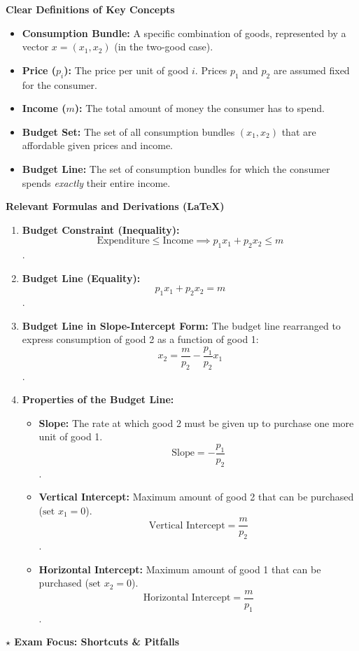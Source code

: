 \documentclass{article}
\begin{document}
\textbf{Clear Definitions of Key Concepts}

\begin{itemize}
    \item \textbf{Consumption Bundle:} A specific combination of goods, represented by a vector $x = (x_1, x_2)$ (in the two-good case).
    \item \textbf{Price ($p_i$):} The price per unit of good $i$. Prices $p_1$ and $p_2$ are assumed fixed for the consumer.
    \item \textbf{Income ($m$):} The total amount of money the consumer has to spend.
    \item \textbf{Budget Set:} The set of all consumption bundles $(x_1, x_2)$ that are affordable given prices and income.
    \item \textbf{Budget Line:} The set of consumption bundles for which the consumer spends \textit{exactly} their entire income.
\end{itemize}

\textbf{Relevant Formulas and Derivations (LaTeX)}

\begin{enumerate}
    \item \textbf{Budget Constraint (Inequality):} $$\text{Expenditure} \leq \text{Income} \implies p_1 x_1 + p_2 x_2 \leq m$$.
    \item \textbf{Budget Line (Equality):} $$p_1 x_1 + p_2 x_2 = m$$.
    \item \textbf{Budget Line in Slope-Intercept Form:} The budget line rearranged to express consumption of good 2 as a function of good 1: $$x_2 = \frac{m}{p_2} - \frac{p_1}{p_2} x_1$$.
    \item \textbf{Properties of the Budget Line:}
    \begin{itemize}
        \item \textbf{Slope:} The rate at which good 2 must be given up to purchase one more unit of good 1. $$\text{Slope} = -\frac{p_1}{p_2}$$.
        \item \textbf{Vertical Intercept:} Maximum amount of good 2 that can be purchased ($\text{set } x_1 = 0$). $$\text{Vertical Intercept} = \frac{m}{p_2}$$.
        \item \textbf{Horizontal Intercept:} Maximum amount of good 1 that can be purchased ($\text{set } x_2 = 0$). $$\text{Horizontal Intercept} = \frac{m}{p_1}$$.
    \end{itemize}
\end{enumerate}

\textbf{$\star$ Exam Focus: Shortcuts \& Pitfalls}
\end{document}
